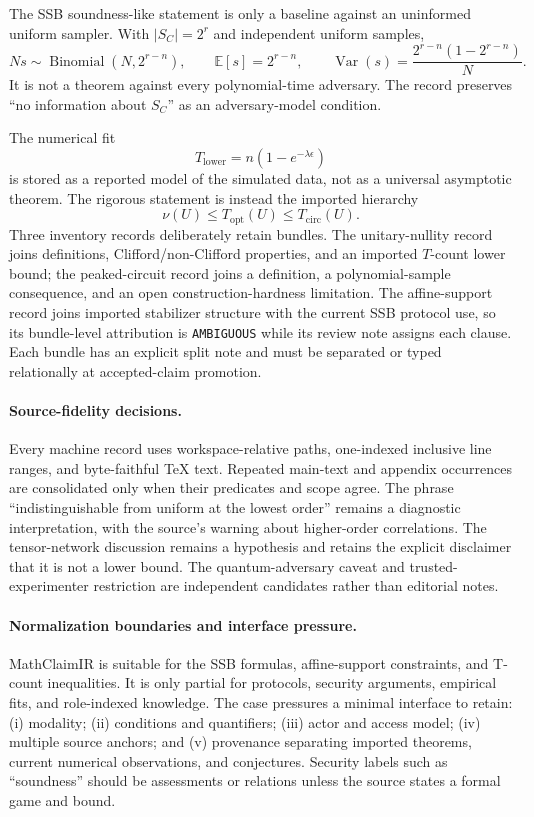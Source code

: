 The SSB soundness-like statement is only a baseline against an uninformed uniform sampler. With $|S_C|=2^r$ and independent uniform samples,
\[
Ns\sim\operatorname{Binomial}(N,2^{r-n}),\qquad
\mathbb E[s]=2^{r-n},\qquad
\operatorname{Var}(s)=\frac{2^{r-n}(1-2^{r-n})}{N}.
\]
It is not a theorem against every polynomial-time adversary. The record preserves ``no information about $S_C$'' as an adversary-model condition.

The numerical fit
\[
T_{\mathrm{lower}}=n(1-e^{-\lambda\epsilon})
\]
is stored as a reported model of the simulated data, not as a universal asymptotic theorem. The rigorous statement is instead the imported hierarchy
\[
\nu(U)\leq T_{\mathrm{opt}}(U)\leq T_{\mathrm{circ}}(U).
\]
Three inventory records deliberately retain bundles. The unitary-nullity record joins definitions, Clifford/non-Clifford properties, and an imported $T$-count lower bound; the peaked-circuit record joins a definition, a polynomial-sample consequence, and an open construction-hardness limitation. The affine-support record joins imported stabilizer structure with the current SSB protocol use, so its bundle-level attribution is \texttt{AMBIGUOUS} while its review note assigns each clause. Each bundle has an explicit split note and must be separated or typed relationally at accepted-claim promotion.

\paragraph{Source-fidelity decisions.}
Every machine record uses workspace-relative paths, one-indexed inclusive line ranges, and byte-faithful TeX text. Repeated main-text and appendix occurrences are consolidated only when their predicates and scope agree. The phrase ``indistinguishable from uniform at the lowest order'' remains a diagnostic interpretation, with the source's warning about higher-order correlations. The tensor-network discussion remains a hypothesis and retains the explicit disclaimer that it is not a lower bound. The quantum-adversary caveat and trusted-experimenter restriction are independent candidates rather than editorial notes.

\paragraph{Normalization boundaries and interface pressure.}
MathClaimIR is suitable for the SSB formulas, affine-support constraints, and T-count inequalities. It is only partial for protocols, security arguments, empirical fits, and role-indexed knowledge. The case pressures a minimal interface to retain: (i) modality; (ii) conditions and quantifiers; (iii) actor and access model; (iv) multiple source anchors; and (v) provenance separating imported theorems, current numerical observations, and conjectures. Security labels such as ``soundness'' should be assessments or relations unless the source states a formal game and bound.

